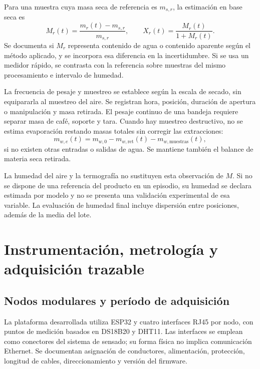 Para una muestra cuya masa seca de referencia es $m_{s,r}$, la estimación en base seca es
\begin{equation}
M_r(t)=\frac{m_r(t)-m_{s,r}}{m_{s,r}},
\qquad
X_r(t)=\frac{M_r(t)}{1+M_r(t)}.
\label{met:humedad_gravimetrica}
\end{equation}
Se documenta si $M_r$ representa contenido de agua o contenido aparente según el método aplicado, y se incorpora esa diferencia en la incertidumbre. Si se usa un medidor rápido, se contrasta con la referencia sobre muestras del mismo procesamiento e intervalo de humedad.

La frecuencia de pesaje y muestreo se establece según la escala de secado, sin equipararla al muestreo del aire. Se registran hora, posición, duración de apertura o manipulación y masa retirada. El pesaje continuo de una bandeja requiere separar masa de café, soporte y tara. Cuando hay muestreo destructivo, no se estima evaporación restando masas totales sin corregir las extracciones:
\begin{equation}
m_{w,e}(t)=m_{w,0}-m_{w,\mathrm{ret}}(t)-m_{w,\mathrm{muestras}}(t),
\label{met:agua_evaporada_pesaje}
\end{equation}
si no existen otras entradas o salidas de agua. Se mantiene también el balance de materia seca retirada.

La humedad del aire y la termografía no sustituyen esta observación de $M$. Si no se dispone de una referencia del producto en un episodio, su humedad se declara estimada por modelo y no se presenta una validación experimental de esa variable. La evaluación de humedad final incluye dispersión entre posiciones, además de la media del lote.

\section{Instrumentación, metrología y adquisición trazable}
\label{met:instrumentacion}

\subsection{Nodos modulares y período de adquisición}

La plataforma desarrollada utiliza ESP32 y cuatro interfaces RJ45 por nodo, con puntos de medición basados en DS18B20 y DHT11. Las interfaces se emplean como conectores del sistema de sensado; su forma física no implica comunicación Ethernet. Se documentan asignación de conductores, alimentación, protección, longitud de cables, direccionamiento y versión del firmware.

